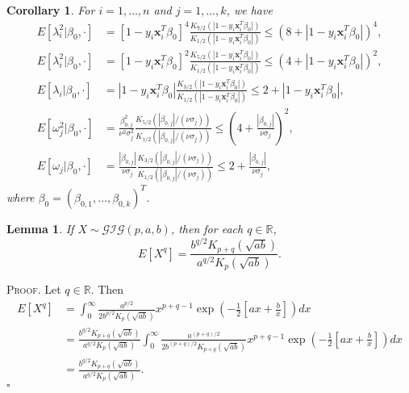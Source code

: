 \documentclass[12pt]{article}
\newtheorem{lemma}[theorem]{Lemma}
\newtheorem{corollary}[theorem]{Corollary}
\newcounter{ProofCounter}
\newenvironment{Proof}{\stepcounter{ProofCounter}\textsc{Proof.}}{\hfill$\square$}
\begin{document}
\begin{corollary}
  For $i = 1,\dots, n$ and $j = 1,\dots,k$, we have
  \begin{align*}
    E[\lambda_i^2|\beta_0, \cdot] & = [1 - y_i\bm{x}_i^T\beta_0]^4 \frac{K_{9/2}\left( |1 - y_i\bm{x}_i^T\beta_0| \right)}{K_{1/2}\left( |1 - y_i\bm{x}_i^T\beta_0|
    \right)} \leq \left( 8 + |1 - y_i \bm{x}_i^T \beta_0| \right)^4, \\
    E[\lambda_i^2|\beta_0, \cdot] & = [1 - y_i\bm{x}_i^T\beta_0]^2 \frac{K_{5/2}\left( |1 - y_i\bm{x}_i^T\beta_0| \right)}{K_{1/2}\left( |1 - y_i\bm{x}_i^T\beta_0|
    \right)} \leq \left( 4 + |1 - y_i \bm{x}_i^T \beta_0| \right)^2, \\
    E[\lambda_i|\beta_0, \cdot] & = |1 - y_i\bm{x}_i^T\beta_0| \frac{K_{3/2}\left( |1 - y_i\bm{x}_i^T\beta_0| \right)}{K_{1/2}\left( |1 - y_i\bm{x}_i^T\beta_0|
    \right)} \leq 2 + |1-y_i\bm{x}_i^T\beta_0|,  \\
    E[\omega_j^2|\beta_0, \cdot] & = \frac{\beta_{0,j}^2}{\nu^2 \sigma_j^2} \frac{K_{5/2}\left( |\beta_{0,j}| / (\nu\sigma_j) \right)}{ 
    K_{1/2}\left( |\beta_{0,j}| / (\nu \sigma_{j}) \right)} \leq \left( 4 + \frac{|\beta_{0,j}|}{\nu \sigma_j} \right)^2, \\
    E[\omega_j|\beta_0, \cdot] & = \frac{|\beta_{0,j}|}{\nu\sigma_j} \frac{K_{3/2}\left( |\beta_{0,j}| / (\nu\sigma_j) \right)}{ 
    K_{1/2}\left( |\beta_{0,j}| / (\nu \sigma_{j}) \right)} \leq 2 + \frac{|\beta_{0,j}|}{\nu \sigma_j},
  \end{align*}
  where $\beta_0 = (\beta_{0,1}, \dots, \beta_{0,k})^T$.
  \label{c2}
\end{corollary}


\begin{lemma}
  If $X \sim \mathcal{GIG}(p, a, b)$, then for each $q \in \mathbb{R}$,
  \[
    E[X^q] =\frac{b^{q/2}K_{p+q}(\sqrt{ab})}{a^{q/2}K_p(\sqrt{ab})}.
  \]
  \label{l5}
\end{lemma}
\begin{Proof}
  Let $q \in \mathbb{R}$. Then 
  \begin{align*}
    E[X^q] & = \int_{0}^{\infty} \frac{a^{p/2}}{2b^{p/2}K_p(\sqrt{ab})} x^{p+q-1}\exp\left( -\frac{1}{2}\left[ ax + \frac{b}{x} \right] \right)dx \\
    & = \frac{b^{q/2}K_{p+q}(\sqrt{ab})}{a^{q/2}K_p(\sqrt{ab})}
    \int_{0}^{\infty}\frac{a^{(p+q)/2}}{2b^{(p+q)/2}K_{p+q}(\sqrt{ab})} x^{p+q-1} \exp\left( -\frac{1}{2}\left[ ax + \frac{b}{x} \right] \right)dx \\
    & = \frac{b^{q/2}K_{p+q}(\sqrt{ab})}{a^{q/2}K_p(\sqrt{ab})}.
  \end{align*}
\end{Proof}
\end{document}
